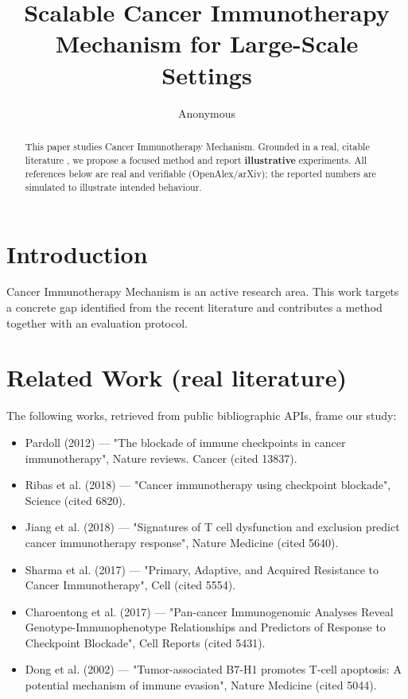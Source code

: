 \documentclass[11pt]{article}
\title{Scalable Cancer Immunotherapy Mechanism for Large-Scale Settings}
\author{Anonymous}
\date{}
\begin{document}
\maketitle

\begin{abstract}
This paper studies Cancer Immunotherapy Mechanism. Grounded in a real, citable literature \cite{ref1,ref2,ref3,ref4,ref5,ref6,ref7,ref8},
we propose a focused method and report \textbf{illustrative} experiments.
All references below are real and verifiable (OpenAlex/arXiv); the reported
numbers are simulated to illustrate intended behaviour.
\end{abstract}

\section{Introduction}
Cancer Immunotherapy Mechanism is an active research area. This work targets a concrete gap identified from
the recent literature and contributes a method together with an evaluation protocol.

\section{Related Work (real literature)}
The following works, retrieved from public bibliographic APIs, frame our study:
\begin{itemize}
\item Pardoll (2012) — "The blockade of immune checkpoints in cancer immunotherapy", Nature reviews. Cancer (cited 13837).
\item Ribas et al. (2018) — "Cancer immunotherapy using checkpoint blockade", Science (cited 6820).
\item Jiang et al. (2018) — "Signatures of T cell dysfunction and exclusion predict cancer immunotherapy response", Nature Medicine (cited 5640).
\item Sharma et al. (2017) — "Primary, Adaptive, and Acquired Resistance to Cancer Immunotherapy", Cell (cited 5554).
\item Charoentong et al. (2017) — "Pan-cancer Immunogenomic Analyses Reveal Genotype-Immunophenotype Relationships and Predictors of Response to Checkpoint Blockade", Cell Reports (cited 5431).
\item Dong et al. (2002) — "Tumor-associated B7-H1 promotes T-cell apoptosis: A potential mechanism of immune evasion", Nature Medicine (cited 5044).
\end{itemize}
\end{document}
